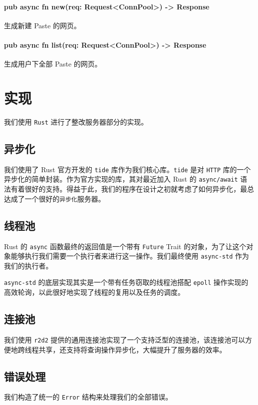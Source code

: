 \documentclass[ichigo,normal,cn]{elegantnote}
\newcommand{\code}[1]{\colorbox{light-gray}{\texttt{#1}}}
\begin{document}
\paragraph{pub async fn new(req: Request<ConnPool>) -> Response}
生成新建 Paste 的网页。

\paragraph{pub async fn list(req: Request<ConnPool>) -> Response}
生成用户下全部 Paste 的网页。

\section{实现}

我们使用 \code{Rust} 进行了整改服务器部分的实现。

\subsection{异步化}
我们使用了 Rust 官方开发的 \code{tide} 库作为我们核心库。\code{tide} 是对 \code{HTTP} 库的一个异步化的简单封装。作为官方实现的库，其对最近加入 Rust 的 \code{async/await} 语法有着很好的支持。得益于此，我们的程序在设计之初就考虑了如何异步化，最总达成了一个很好的\code{异步化}服务器。

\subsection{线程池}
Rust 的 \code{async} 函数最终的返回值是一个带有 \code{Future} Trait 的对象，为了让这个对象能够执行我们需要一个执行者来进行这一操作。我们最终使用 \code{async-std} 作为我们的执行者。

\code{async-std} 的底层实现其实是一个带有任务窃取的线程池搭配 \code{epoll} 操作实现的高效轮询，以此很好地实现了线程的复用以及任务的调度。

\subsection{连接池}
我们使用 \code{r2d2} 提供的通用连接池实现了一个支持泛型的连接池，该连接池可以方便地跨线程共享，还支持将查询操作异步化，大幅提升了服务器的效率。

\subsection{错误处理}
我们构造了统一的 \code{Error} 结构来处理我们的全部错误。
\end{document}
